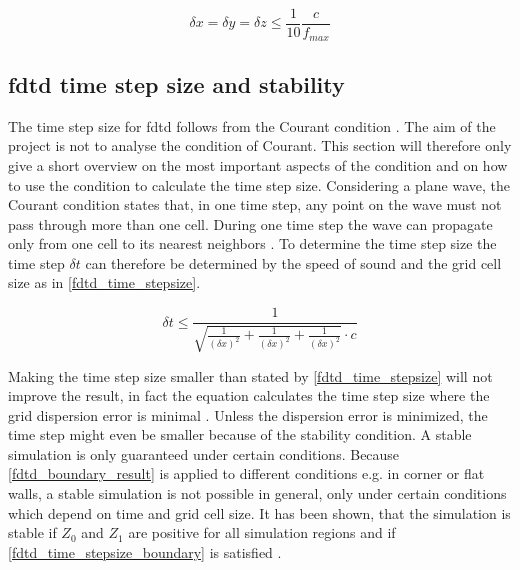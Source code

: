 \begin{equation}\label{fdtd_delta_stepsize}
\delta x = \delta y = \delta z \leq \frac{1}{10} \frac{c}{f_{max}}
\end{equation}

    \startexplain
    \stopexplain
    
    
    

\subsection{\gls{fdtd} time step size and stability}   \label{sec:fdtd_time_stepsize} 
The time step size for \gls{fdtd} follows from the Courant condition \citep{Kunz1993}. The aim of the project is not to analyse the condition of Courant. This section will therefore only give a short overview on the most important aspects of the condition and on how to use the condition to calculate the time step size. Considering a plane wave, the Courant condition states that, in one time step, any point on the wave must not pass through more than one cell. During one time step the wave can propagate only from one cell to its nearest neighbors \citep{Kunz1993}. To determine the time step size the time step $\delta t $ can therefore be determined by the speed of sound and the grid cell size as in \autoref{fdtd_time_stepsize}.



\begin{equation}\label{fdtd_time_stepsize}
\delta t \leq \frac{1}{\sqrt{\frac{1}{(\delta x)^2}+\frac{1}{(\delta x)^2}+\frac{1}{(\delta x)^2} }\cdot c}
\end{equation}
        \startexplain
    \stopexplain
    
Making the time step size smaller than stated by \autoref{fdtd_time_stepsize} will not improve the result, in fact the equation calculates the time step size where the grid dispersion error is minimal \citep{Kunz1993}. Unless the dispersion error is minimized, the time step might even be  smaller because of the stability condition. 
A stable simulation is only guaranteed under certain conditions. Because \autoref{fdtd_boundary_result} is applied to different conditions e.g. in corner or flat walls, a stable simulation is not possible in general, only under certain conditions which depend on time and grid cell size. It has been shown, that the simulation is stable if $Z_0$ and $Z_{1}$ are positive for all simulation regions and if \autoref{fdtd_time_stepsize_boundary} is satisfied \citep{finiteproblems}.

